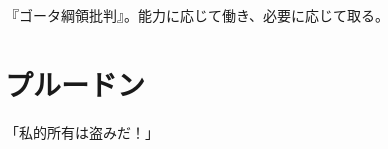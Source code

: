 \documentclass[]{jsarticle}
\begin{document}
『ゴータ綱領批判』。能力に応じて働き、必要に応じて取る。



\section{プルードン}

「私的所有は盗みだ！」





\nocite{高晃公95:マルクス}
\nocite{大川正彦04:マルクス}
\nocite{kymlicka90:_contem_polit_philos}
\nocite{marx1848:_manif_kommun_partei:水田}
\nocite{marx1848:_commun_manif}
  

\end{document}

